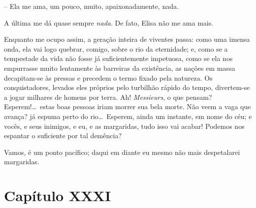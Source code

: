 -- Ela me ama, um pouco, muito, apaixonadamente, nada. 

A última me dá quase sempre \textit{nada}. De fato, Elisa não me ama
mais.

Enquanto me ocupo assim, a geração inteira de viventes passa: como uma
imensa onda, ela vai logo quebrar, comigo, sobre o rio da eternidade;
e, como se a tempestade da vida não fosse já suficientemente impetuosa,
como se ela nos empurrasse muito lentamente às barreiras da existência,
as nações em massa decapitam-se às pressas e precedem o termo fixado
pela natureza. Os conquistadores, levados eles próprios pelo turbilhão
rápido do tempo, divertem-se a jogar milhares de homens por terra. Ah!
\textit{Messieurs}, o que pensam? Esperem!\ldots\ estas boas pessoas iriam
morrer sua bela morte. Não veem a vaga que avança? já espuma perto do
rio\ldots\ Esperem, ainda um instante, em nome do céu; e vocês, e seus
inimigos, e eu, e as margaridas, tudo isso vai acabar! Podemos nos
espantar o suficiente por tal demência?

Vamos, é um ponto pacífico; daqui em diante eu mesmo não mais
despetalarei margaridas.

\section{Capítulo XXXI}


